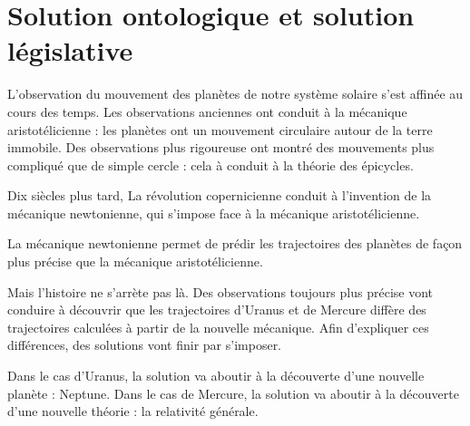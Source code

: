 \section{Solution ontologique et solution législative}


L'observation du mouvement des planètes de notre système solaire s'est affinée au cours des temps. Les observations anciennes ont conduit à la mécanique aristotélicienne : les planètes ont un mouvement circulaire autour de la terre immobile. Des observations plus rigoureuse ont montré des mouvements plus compliqué que de simple cercle : cela à conduit à la théorie des épicycles.

Dix siècles plus tard, La révolution copernicienne conduit à l'invention de la mécanique newtonienne, qui s'impose face à la mécanique aristotélicienne.

La mécanique newtonienne permet de prédir les trajectoires des planètes de façon plus précise que la mécanique aristotélicienne.

Mais l'histoire ne s'arrète pas là. Des observations toujours plus précise vont conduire à découvrir que les trajectoires d'Uranus et de Mercure diffère des trajectoires calculées à partir de la nouvelle mécanique. Afin d'expliquer ces différences, des solutions vont finir par s'imposer.

Dans le cas d'Uranus, la solution va aboutir à la découverte d'une nouvelle planète : Neptune. Dans le cas de Mercure, la solution va aboutir à la découverte d'une nouvelle théorie : la relativité générale.

